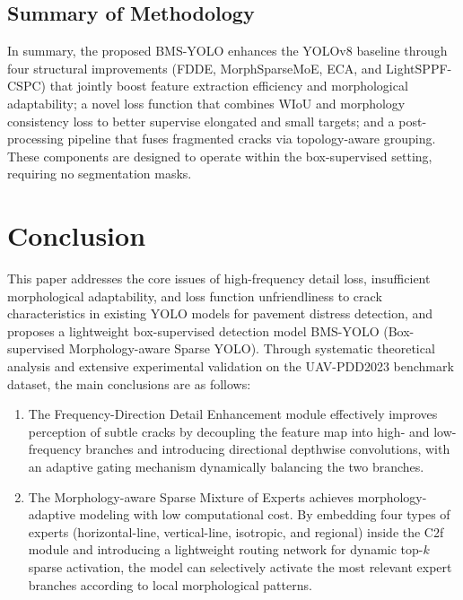 \documentclass{ieeeaccess}
\begin{document}
{\subsection{Summary of Methodology}

In summary, the proposed BMS-YOLO enhances the YOLOv8 baseline through four structural improvements (FDDE, MorphSparseMoE, ECA, and LightSPPF-CSPC) that jointly boost feature extraction efficiency and morphological adaptability; a novel loss function that combines WIoU and morphology consistency loss to better supervise elongated and small targets; and a post-processing pipeline that fuses fragmented cracks via topology-aware grouping. These components are designed to operate within the box-supervised setting, requiring no segmentation masks.



\section{Conclusion}
\label{sec:concl}

This paper addresses the core issues of high-frequency detail loss, insufficient morphological adaptability, and loss function unfriendliness to crack characteristics in existing YOLO models for pavement distress detection, and proposes a lightweight box-supervised detection model BMS-YOLO (Box-supervised Morphology-aware Sparse YOLO). Through systematic theoretical analysis and extensive experimental validation on the UAV-PDD2023 benchmark dataset, the main conclusions are as follows:

\begin{enumerate}
\item The Frequency-Direction Detail Enhancement module effectively improves perception of subtle cracks by decoupling the feature map into high- and low-frequency branches and introducing directional depthwise convolutions, with an adaptive gating mechanism dynamically balancing the two branches.

\item The Morphology-aware Sparse Mixture of Experts achieves morphology-adaptive modeling with low computational cost. By embedding four types of experts (horizontal-line, vertical-line, isotropic, and regional) inside the C2f module and introducing a lightweight routing network for dynamic top-$k$ sparse activation, the model can selectively activate the most relevant expert branches according to local morphological patterns.


\end{enumerate}}
\end{document}
